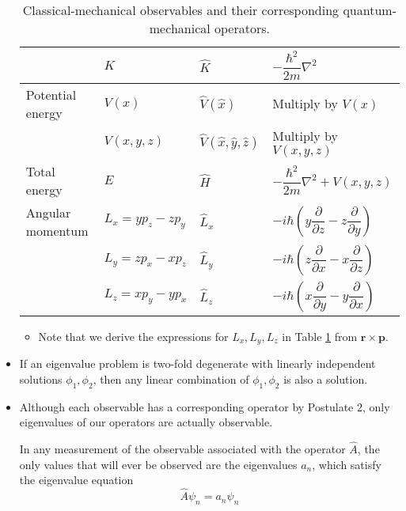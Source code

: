 \documentclass[../notes.tex]{subfiles}
\begin{document}
\begin{itemize}
\begin{table}[h!]
\begin{tabular}{ll|ll}
            \rule{0pt}{7mm} & $K$ & $\hat{K}$ & $-\dfrac{\hbar^2}{2m}\nabla^2$\\
            \hline
            Potential energy & $V(x)$ & $\hat{V}(\hat{x})$ & Multiply by $V(x)$\\
             & $V(x,y,z)$ & $\hat{V}(\hat{x},\hat{y},\hat{z})$ & Multiply by $V(x,y,z)$\\
            \hline
            \rule{0pt}{6mm}Total energy & $E$ & $\hat{H}$ & $-\dfrac{\hbar^2}{2m}\nabla^2+V(x,y,z)$\\
            \hline
            \rule{0pt}{6mm}Angular momentum & $L_x=yp_z-zp_y$ & $\hat{L}_x$ & $-i\hbar\left( y\dfrac{\partial}{\partial z}-z\dfrac{\partial}{\partial y} \right)$\\
            \rule{0pt}{7mm} & $L_y=zp_x-xp_z$ & $\hat{L}_y$ & $-i\hbar\left( z\dfrac{\partial}{\partial x}-x\dfrac{\partial}{\partial z} \right)$\\
            \rule{0pt}{7mm} & $L_z=xp_y-yp_x$ & $\hat{L}_z$ & $-i\hbar\left( x\dfrac{\partial}{\partial y}-y\dfrac{\partial}{\partial x} \right)$\\
            \bottomrule
        \end{tabular}
        \caption{Classical-mechanical observables and their corresponding quantum-mechanical operators.}
        \label{tab:observablesOperators}
    \end{table}
    \begin{itemize}
        \item Note that we derive the expressions for $L_x,L_y,L_z$ in Table \ref{tab:observablesOperators} from $\mathbf{r}\times\mathbf{p}$.
    \end{itemize}
    \item If an eigenvalue problem is two-fold degenerate with linearly independent solutions $\phi_1,\phi_2$, then any linear combination of $\phi_1,\phi_2$ is also a solution.
    \item Although each observable has a corresponding operator by Postulate 2, only eigenvalues of our operators are actually observable.
    \begin{postulate}
        In any measurement of the observable associated with the operator $\hat{A}$, the only values that will ever be observed are the eigenvalues $a_n$, which satisfy the eigenvalue equation
        \begin{equation*}
            \hat{A}\psi_n = a_n\psi_n
        \end{equation*}
    \end{postulate}

\end{itemize}
\end{document}
